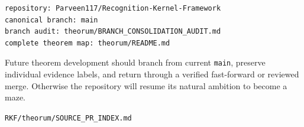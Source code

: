 \begin{verbatim}
repository: Parveen117/Recognition-Kernel-Framework
canonical branch: main
branch audit: theorum/BRANCH_CONSOLIDATION_AUDIT.md
complete theorem map: theorum/README.md
\end{verbatim}

Future theorem development should branch from current \texttt{main}, preserve individual evidence labels, and return through a verified fast-forward or reviewed merge. Otherwise the repository will resume its natural ambition to become a maze.

\begin{flushright}\small\texttt{RKF/theorum/SOURCE\_PR\_INDEX.md}\end{flushright}
